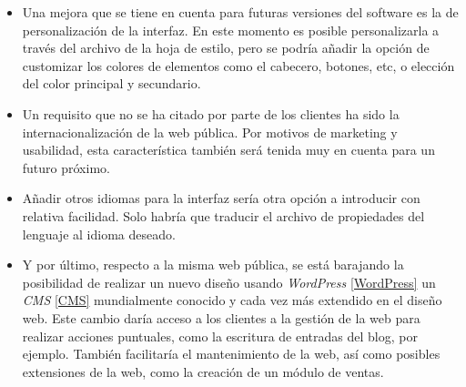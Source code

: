 \begin{itemize}
\item Una mejora que se tiene en cuenta para futuras versiones del software es la de personalización de la interfaz. En este momento es posible personalizarla a través del archivo de la hoja de estilo, pero se podría añadir la opción de customizar los colores de elementos como el cabecero, botones, etc, o elección del color principal y secundario.
\item Un requisito que no se ha citado por parte de los clientes ha sido la internacionalización de la web pública. Por motivos de marketing y usabilidad, esta característica también será tenida muy en cuenta para un futuro próximo.
\item Añadir otros idiomas para la interfaz sería otra opción a introducir con relativa facilidad. Solo habría que traducir el archivo de propiedades del lenguaje al idioma deseado. 
\item Y por último, respecto a la misma web pública, se está barajando la posibilidad de realizar un nuevo diseño usando \textit{WordPress} \ref{WordPress} un \textit{CMS} \ref{CMS} mundialmente conocido y cada vez más extendido en el diseño web. Este cambio daría acceso a los clientes a la gestión de la web para realizar acciones puntuales, como la escritura de entradas del blog, por ejemplo. También facilitaría el mantenimiento de la web, así como posibles extensiones de la web, como la creación de un módulo de ventas. 
\end{itemize}


